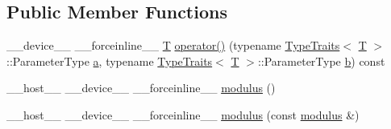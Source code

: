 \subsection*{Public Member Functions}
\begin{DoxyCompactItemize}
\item 
\-\_\-\-\_\-device\-\_\-\-\_\- \-\_\-\-\_\-forceinline\-\_\-\-\_\- \hyperlink{calib3d_8hpp_a3efb9551a871ddd0463079a808916717}{T} \hyperlink{structcv_1_1gpu_1_1device_1_1modulus_a6cf78c65b0ef4b64f0f8b59d364aaeb8}{operator()} (typename \hyperlink{structcv_1_1gpu_1_1device_1_1TypeTraits}{Type\-Traits}$<$ \hyperlink{calib3d_8hpp_a3efb9551a871ddd0463079a808916717}{T} $>$\-::Parameter\-Type \hyperlink{legacy_8hpp_a1031d0e0a97a340abfe0a6ab9e831045}{a}, typename \hyperlink{structcv_1_1gpu_1_1device_1_1TypeTraits}{Type\-Traits}$<$ \hyperlink{calib3d_8hpp_a3efb9551a871ddd0463079a808916717}{T} $>$\-::Parameter\-Type \hyperlink{legacy_8hpp_ac04272e8ca865b8fba18d36edae9fd2a}{b}) const 
\item 
\-\_\-\-\_\-host\-\_\-\-\_\- \-\_\-\-\_\-device\-\_\-\-\_\- \-\_\-\-\_\-forceinline\-\_\-\-\_\- \hyperlink{structcv_1_1gpu_1_1device_1_1modulus_aaf0f92256db4aeb630e1499f1034ded4}{modulus} ()
\item 
\-\_\-\-\_\-host\-\_\-\-\_\- \-\_\-\-\_\-device\-\_\-\-\_\- \-\_\-\-\_\-forceinline\-\_\-\-\_\- \hyperlink{structcv_1_1gpu_1_1device_1_1modulus_acd46e3a004f1a26e716b264bf56e6063}{modulus} (const \hyperlink{structcv_1_1gpu_1_1device_1_1modulus}{modulus} \&)
\end{DoxyCompactItemize}


